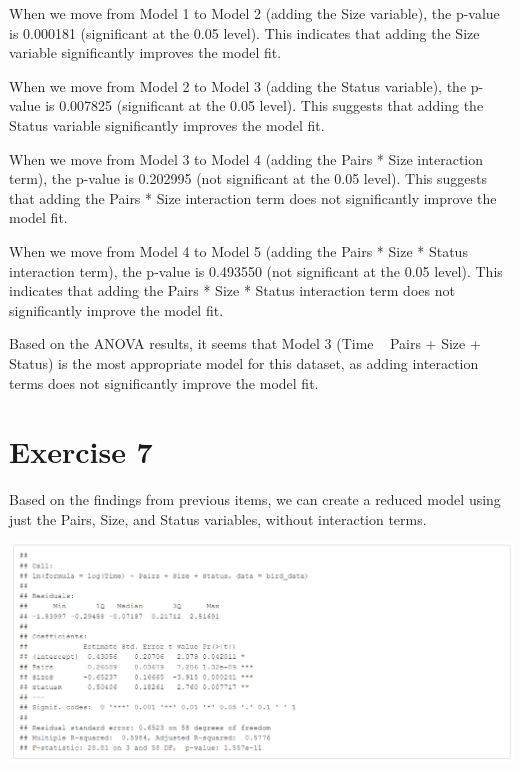 \documentclass{article}
\begin{document}
When we move from Model 1 to Model 2 (adding the Size variable), the p-value is 0.000181 (significant at the 0.05 level). This indicates that adding the Size variable significantly improves the model fit.

When we move from Model 2 to Model 3 (adding the Status variable), the p-value is 0.007825 (significant at the 0.05 level). This suggests that adding the Status variable significantly improves the model fit.

When we move from Model 3 to Model 4 (adding the Pairs * Size interaction term), the p-value is 0.202995 (not significant at the 0.05 level). This suggests that adding the Pairs * Size interaction term does not significantly improve the model fit.

When we move from Model 4 to Model 5 (adding the Pairs * Size * Status interaction term), the p-value is 0.493550 (not significant at the 0.05 level). This indicates that adding the Pairs * Size * Status interaction term does not significantly improve the model fit.

Based on the ANOVA results, it seems that Model 3 (Time ~ Pairs + Size + Status) is the most appropriate model for this dataset, as adding interaction terms does not significantly improve the model fit.

\section{Exercise 7}
Based on the findings from previous items, we can create a reduced model using just the Pairs, Size, and Status variables, without interaction terms.


\includegraphics[scale=0.5]{tables/all-added.png}
\end{document}
